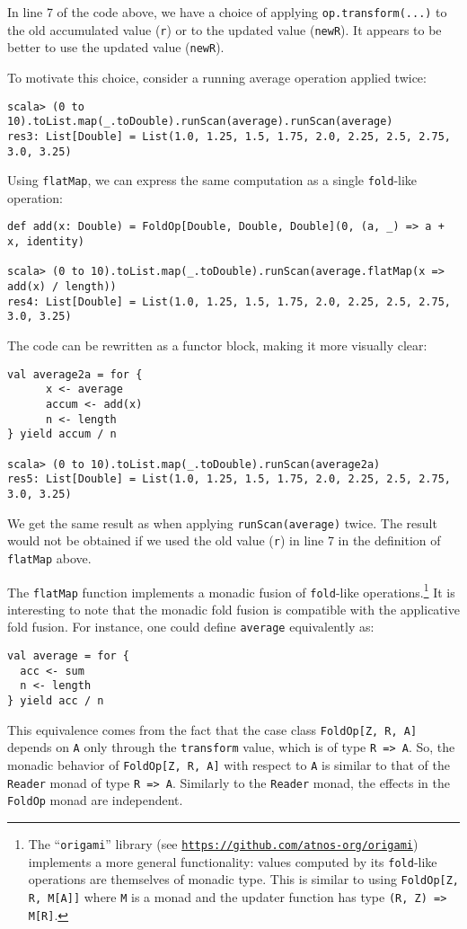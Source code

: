 In line 7 of the code above, we have a choice of applying \lstinline!op.transform(...)!
to the old accumulated value (\lstinline!r!) or to the updated value
(\lstinline!newR!). It appears to be better to use the updated value
(\lstinline!newR!). 

To motivate this choice, consider a running average operation applied
twice:
\begin{lstlisting}
scala> (0 to 10).toList.map(_.toDouble).runScan(average).runScan(average)
res3: List[Double] = List(1.0, 1.25, 1.5, 1.75, 2.0, 2.25, 2.5, 2.75, 3.0, 3.25)
\end{lstlisting}
Using \lstinline!flatMap!, we can express the same computation as
a single \lstinline!fold!-like operation:
\begin{lstlisting}
def add(x: Double) = FoldOp[Double, Double, Double](0, (a, _) => a + x, identity)

scala> (0 to 10).toList.map(_.toDouble).runScan(average.flatMap(x => add(x) / length))
res4: List[Double] = List(1.0, 1.25, 1.5, 1.75, 2.0, 2.25, 2.5, 2.75, 3.0, 3.25)
\end{lstlisting}
The code can be rewritten as a functor block, making it more visually
clear:
\begin{lstlisting}
val average2a = for {
      x <- average
      accum <- add(x)
      n <- length
} yield accum / n

scala> (0 to 10).toList.map(_.toDouble).runScan(average2a)
res5: List[Double] = List(1.0, 1.25, 1.5, 1.75, 2.0, 2.25, 2.5, 2.75, 3.0, 3.25)
\end{lstlisting}
We get the same result as when applying \lstinline!runScan(average)!
twice. The result would not be obtained if we used the old value (\lstinline!r!)
in line 7 in the definition of \lstinline!flatMap! above.

The \lstinline!flatMap! function implements a monadic fusion of \lstinline!fold!-like
operations.\footnote{The \textsf{``}\texttt{origami}\textsf{''} library (see \texttt{\href{https://github.com/atnos-org/origami}{https://github.com/atnos-org/origami}})
implements a more general functionality: values computed by its \lstinline!fold!-like
operations are themselves of monadic type. This is similar to using
\lstinline!FoldOp[Z, R, M[A]]! where \lstinline!M! is a monad and
the updater function has type \lstinline!(R, Z) => M[R]!.} It is interesting to note that the monadic fold fusion is compatible
with the applicative fold fusion. For instance, one could define \lstinline!average!
equivalently as:
\begin{lstlisting}
val average = for {
  acc <- sum
  n <- length
} yield acc / n
\end{lstlisting}
This equivalence comes from the fact that the case class \lstinline!FoldOp[Z, R, A]!
depends on \lstinline!A! only through the \lstinline!transform!
value, which is of type \lstinline!R => A!. So, the monadic behavior
of \lstinline!FoldOp[Z, R, A]! with respect to \lstinline!A! is
similar to that of the \lstinline!Reader! monad of type \lstinline!R => A!.
Similarly to the \lstinline!Reader! monad, the effects in the \lstinline!FoldOp!
monad are independent.

